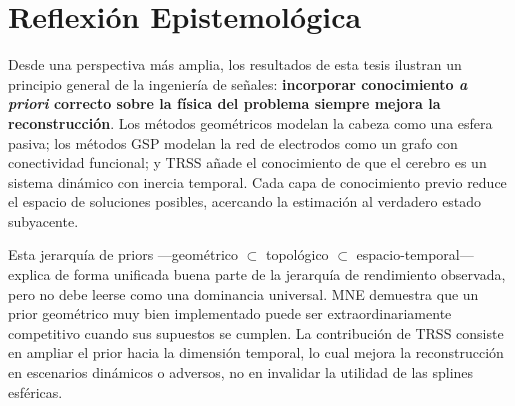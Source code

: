 \section{Reflexión Epistemológica}

Desde una perspectiva más amplia, los resultados de esta tesis ilustran un principio general de la ingeniería de señales: \textbf{incorporar conocimiento \textit{a priori} correcto sobre la física del problema siempre mejora la reconstrucción}. Los métodos geométricos modelan la cabeza como una esfera pasiva; los métodos GSP modelan la red de electrodos como un grafo con conectividad funcional; y TRSS añade el conocimiento de que el cerebro es un sistema dinámico con inercia temporal. Cada capa de conocimiento previo reduce el espacio de soluciones posibles, acercando la estimación al verdadero estado subyacente.

Esta jerarquía de priors ---geométrico $\subset$ topológico $\subset$ espacio-temporal--- explica de forma unificada buena parte de la jerarquía de rendimiento observada, pero no debe leerse como una dominancia universal. MNE demuestra que un prior geométrico muy bien implementado puede ser extraordinariamente competitivo cuando sus supuestos se cumplen. La contribución de TRSS consiste en ampliar el prior hacia la dimensión temporal, lo cual mejora la reconstrucción en escenarios dinámicos o adversos, no en invalidar la utilidad de las splines esféricas.
